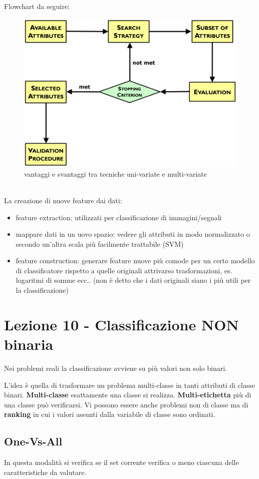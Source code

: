 Flowchart da seguire:
\begin{figure}[h!]
	\centering
	\includegraphics[height=0.45 \linewidth]{pict/feature_flowchart.png}
	\caption{vantaggi e svantaggi tra tecniche uni-variate e multi-variate}
\end{figure}
\\
La creazione di nuove feature dai dati:
\begin{itemize}
	\item feature extraction: utilizzati per classificazione di immagini/segnali
	\item mappare dati in un uovo spazio: vedere gli attributi in modo normalizzato o secondo un'altra scala pi\`u facilmente trattabile (SVM)
	\item feature construction: generare feature nuove pi\`u comode per un certo modello di classificatore rispetto a quelle originali attrivarso trasformazioni, es. logaritmi di somme ecc.. (non \`e detto che i dati originali siano i pi\`u utili per la classificazione)
\end{itemize}

\section{Lezione 10 - Classificazione NON binaria}

Nei problemi reali la classificazione avviene su pi\`u valori non solo binari.

L'idea \`e quella di trasformare un problema multi-classe in tanti attributi di classe binari. \textbf{Multi-classe} esattamente una classe si realizza. \textbf{Multi-etichetta} pi\`u di una classe pu\`o verificarsi. Vi possono essere anche problemi non di classe ma di \textbf{ranking} in cui i valori assunti dalla variabile di classe sono ordinati.

\subsection{One-Vs-All}
In questa modalit\`a si verifica se il set corrente verifica o meno ciascuna delle caratteristiche da valutare. 

